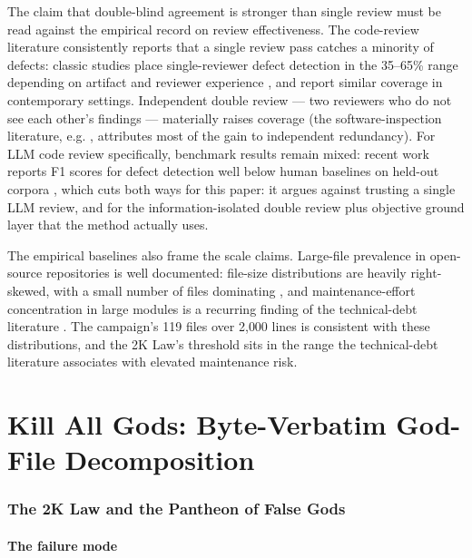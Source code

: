\documentclass[11pt]{article}
\theoremstyle{definition}
\theoremstyle{plain}
\theoremstyle{remark}
\begin{document}
The claim that double-blind agreement is stronger than single review must be
read against the empirical record on review effectiveness. The code-review
literature consistently reports that a single review pass catches a minority
of defects: classic studies place single-reviewer defect detection in the
35--65\% range depending on artifact and reviewer experience
\citep{porter1994,bacchelli2013}, and \citet{kononenko2015} report similar
coverage in contemporary settings. Independent double review --- two
reviewers who do not see each other's findings --- materially raises
coverage (the software-inspection literature, e.g. \citet{tomkins2017},
attributes most of the gain to independent redundancy). For LLM code review
specifically, benchmark results remain mixed: recent work reports F1 scores
for defect detection well below human baselines on held-out corpora
\citep{lu2023}, which cuts both ways for this paper: it argues against
trusting a single LLM review, and for the information-isolated double review
plus objective ground layer that the method actually uses.

The empirical baselines also frame the scale claims. Large-file prevalence
in open-source repositories is well documented: file-size distributions are
heavily right-skewed, with a small number of files dominating
\citep{herraiz2007,koru2009}, and maintenance-effort concentration in large
modules is a recurring finding of the technical-debt literature
\citep{cunningham1992,kruchten2012}. The campaign's 119 files over 2{,}000
lines is consistent with these distributions, and the 2K Law's threshold
sits in the range the technical-debt literature associates with elevated
maintenance risk.


\part{Kill All Gods: Byte-Verbatim God-File Decomposition}
\label{part:kag}

\section{The 2K Law and the Pantheon of False Gods}
\label{sec:kag}

\subsection{The failure mode}
\end{document}
